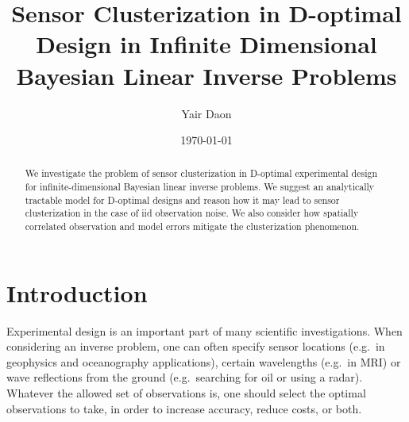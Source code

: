 \documentclass{amsart}
\numberwithin{equation}{section}
\begin{document}
\title[Sensor Clusterization in D-optimal design in infinite
  dimensions]{Sensor Clusterization in D-optimal Design in Infinite
  Dimensional Bayesian Linear Inverse Problems}

\author{Yair Daon}
\address{Porter School of the Environment and Earth
  Sciences, Tel Aviv University\\ Tel Aviv, Israel}

\date{\today}

\begin{abstract}
  We investigate the problem of sensor clusterization in D-optimal
  experimental design for infinite-dimensional Bayesian linear inverse
  problems. We suggest an analytically tractable model for D-optimal
  designs and reason how it may lead to sensor clusterization in the
  case of iid observation noise. We also consider how spatially
  correlated observation and model errors mitigate the clusterization
  phenomenon.

\end{abstract}

\maketitle

\section{Introduction}\label{section:OED intro}
Experimental design is an important part of many scientific
investigations. When considering an inverse problem, one can often
specify sensor locations (e.g.\ in geophysics and oceanography
applications), certain wavelengths (e.g.\ in MRI) or wave reflections
from the ground (e.g.\ searching for oil or using a radar). Whatever
the allowed set of observations is, one should select the optimal
observations to take, in order to increase accuracy, reduce costs, or
both.
\end{document}

